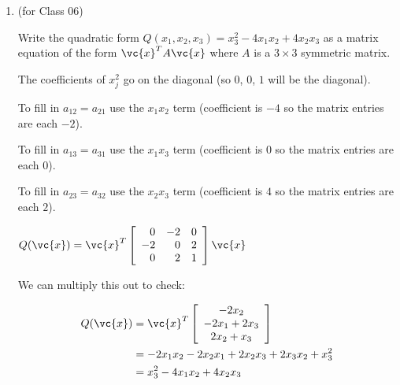 \documentclass[12pt,letterpaper,answers]{exam}
\begin{document}
\begin{enumerate}
\begin{solution}
\end{solution}


\item (for Class 06)

Write the quadratic form $Q(x_1,x_2,x_3) = x_3^2 - 4x_1x_2 + 4x_2x_3$ as a matrix equation of the form $\vc{x}^TA\vc{x}$ where $A$ is a $3\times 3$ symmetric matrix.

\begin{solution}
The coefficients of $x_j^2$ go on the diagonal (so $0$, $0$, $1$ will be the diagonal).

To fill in $a_{12} = a_{21}$ use the $x_1x_2$ term (coefficient is $-4$ so the matrix entries are each $-2$).

To fill in $a_{13} = a_{31}$ use the $x_1x_3$ term (coefficient is $0$ so the matrix entries are each $0$).

To fill in $a_{23} = a_{32}$ use the $x_2x_3$ term (coefficient is $4$ so the matrix entries are each $2$).


$Q(\vc{x}) = \vc{x}^T\left[\begin{array}{r r r} 
0 & -2 & 0 \\
-2 & 0 & 2 \\
0 & 2 & 1
\end{array}\right] \vc{x}$

We can multiply this out to check:

\begin{align*}
    Q(\vc{x}) &= \vc{x}^T\left[\begin{array}{c}
-2x_2 \\
-2x_1 + 2x_3 \\
2x_2 + x_3
\end{array}
\right] \\
&= -2x_1x_2 - 2x_2x_1 + 2x_2x_3 + 2x_3x_2 + x_3^2 \\
&= x_3^2 - 4x_1x_2 + 4x_2x_3
\end{align*}
\end{solution}



\end{enumerate}
\end{document}
